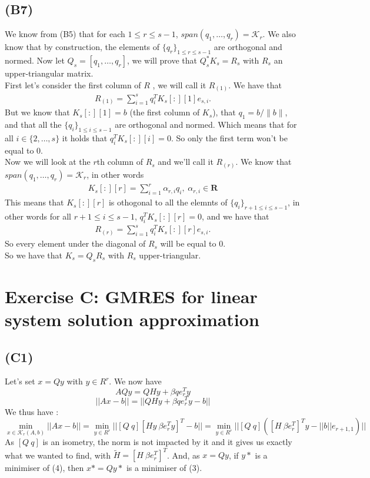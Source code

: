 \documentclass{article}
\begin{document}
\subsection*{(B7)}

We know from (B5) that for each $1 \leq r \leq s-1$, $span(q_1, \dots, q_r) = \mathcal{K}_r$. We also know that by construction, the elements of $\{ q_r \}_{1 \leq r \leq s-1}$ are orthogonal and normed. Now let $Q_s=[q_1, \dots, q_r]$, we will prove that $Q^*_sK_s=R_s$ with $R_s$ an upper-triangular matrix.\\
First let's consider the first column of $R$ , we will call it $R_{(1)}$. We have that 
\begin{align*}
    R_{(1)} = \sum_{i=1}^{s} q_i^TK_s[:][1]e_{s,i}.
\end{align*}
But we know that $K_s[:][1]=b$ (the first column of $K_s$), that $q_1=b/\|b\|$, and that all the $\{ q_i \}_{1 \leq i \leq s-1}$ are orthogonal and normed. Which means that for all $i \in \{2, \dots, s \}$ it holds that $q_i^TK_s[:][i]=0$. So only the first term won't be equal to $0$.\\

Now we will look at the $r$th column of $R_s$ and we'll call it $R_{(r)}$. We know that $span(q_1, \dots, q_r) = \mathcal{K}_r$, in other words 
\begin{align*}
    K_s[:][r]=\sum_{i=1}^{r}\alpha_{r,i}q_i, \hspace{3pt} \alpha_{r,i} \in \mathbf{R}
\end{align*}
This means that $K_s[:][r]$ is othogonal to all the elemnts of $\{ q_i \}_{r+1 \leq i \leq s-1}$, in other words for all $r+1 \leq i \leq s-1$, $q_i^TK_s[:][r]=0$, and we have that
\begin{align*}
    R_{(r)} = \sum_{i=1}^{s} q_i^TK_s[:][r]e_{s,i}.
\end{align*}
So every element under the diagonal of $R_s$ will be equal to $0$.\\
So we have that $K_s=Q_sR_s$ with $R_s$ upper-triangular.

\newpage
\section{Exercise C: GMRES for linear system solution approximation}
\subsection*{(C1)}
Let's set $x = Qy$ with $y \in R^r$. We now have
\[
AQy = QHy + \beta q e_r^T y
\]
\[
||Ax-b|| = ||QHy + \beta q e_r^T y -b ||
\]
We thus have :
\[
\min_{x \in \mathcal{K}_r(A,b)} ||Ax-b|| = \min_{y \in R^r} ||
[Q ~ q] [Hy ~\beta e_r^Ty]^T - b||
= \min_{y \in R^r} ||
[Q ~ q]( [H ~\beta e_r^T]^T y - ||b|| e_{r+1,1})||
\]
As $[Q ~ q]$ is an isometry, the norm is not impacted by it and it gives us exactly what we wanted to find, with $\tilde{H}= [H ~\beta e_r^T]^T$.
And, as $x = Qy$, if 
$y*$ is a minimiser of (4), then $x* = Qy*$ is a minimiser of (3). 
\end{document}
